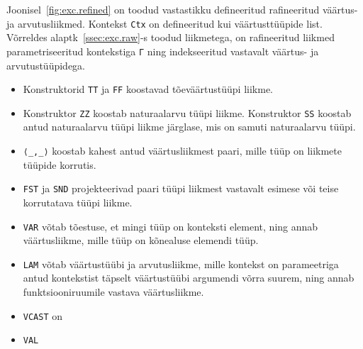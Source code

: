 \documentclass[a4paper,12pt]{article}
\begin{document}
Joonisel~\ref{fig:exc.refined} on toodud vastastikku defineeritud rafineeritud väärtus- ja arvutusliikmed.
Kontekst {\tt Ctx} on defineeritud kui väärtusttüüpide list.
Võrreldes alaptk~\ref{ssec:exc.raw}-s toodud liikmetega, on rafineeritud liikmed parametriseeritud kontekstiga {\tt Γ} ning indekseeritud vastavalt väärtus- ja arvutustüüpidega.
\begin{itemize}
\item Konstruktorid {\tt TT} ja {\tt FF} koostavad tõeväärtustüüpi liikme.
\item Konstruktor {\tt ZZ} koostab naturaalarvu tüüpi liikme. Konstruktor {\tt SS} koostab antud naturaalarvu tüüpi liikme järglase, mis on samuti naturaalarvu tüüpi.
\item {\tt ⟨_,_⟩} koostab kahest antud väärtusliikmest paari, mille tüüp on liikmete tüüpide korrutis.
\item {\tt FST} ja {\tt SND} projekteerivad paari tüüpi liikmest vastavalt esimese või teise korrutatava tüüpi liikme.
\item {\tt VAR} võtab tõestuse, et mingi tüüp on konteksti element, ning annab väärtusliikme, mille tüüp on kõnealuse elemendi tüüp.
\item {\tt LAM} võtab väärtustüübi ja arvutusliikme, mille kontekst on parameetriga antud kontekstist täpselt väärtustüübi argumendi võrra suurem, ning annab funktsiooniruumile vastava väärtusliikme.
\item {\tt VCAST} on 
\end{itemize}

\begin{itemize}
\item {\tt VAL} 
\end{itemize}
\end{document}
